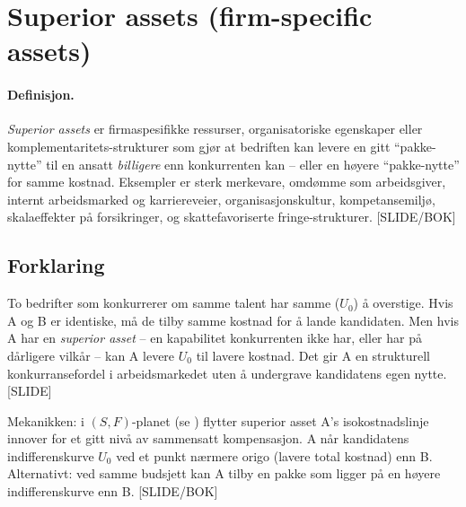 \section{Superior assets (firm-specific assets)}\label{thr:superior-assets}

\paragraph{Definisjon.} \emph{Superior assets} er firmaspesifikke ressurser, organisatoriske egenskaper eller komplementaritets-strukturer som gjør at bedriften kan levere en gitt ``pakke-nytte'' til en ansatt \emph{billigere} enn konkurrenten kan -- eller en høyere ``pakke-nytte'' for samme kostnad. Eksempler er sterk merkevare, omdømme som arbeidsgiver, internt arbeidsmarked og karriereveier, organisasjonskultur, kompetansemiljø, skalaeffekter på forsikringer, og skattefavoriserte fringe-strukturer. [SLIDE/BOK]

\subsection*{Forklaring}

To bedrifter som konkurrerer om samme talent har samme  ($U_0$) å overstige. Hvis A og B er identiske, må de tilby samme kostnad for å lande kandidaten. Men hvis A har en \emph{superior asset} -- en kapabilitet konkurrenten ikke har, eller har på dårligere vilkår -- kan A levere $U_0$ til lavere kostnad. Det gir A en strukturell konkurransefordel i arbeidsmarkedet uten å undergrave kandidatens egen nytte. [SLIDE]

Mekanikken: i $(S,F)$-planet (se ) flytter superior asset A's isokostnadslinje innover for et gitt nivå av sammensatt kompensasjon. A når kandidatens indifferenskurve $U_0$ ved et punkt nærmere origo (lavere total kostnad) enn B. Alternativt: ved samme budsjett kan A tilby en pakke som ligger på en høyere indifferenskurve enn B. [SLIDE/BOK]


